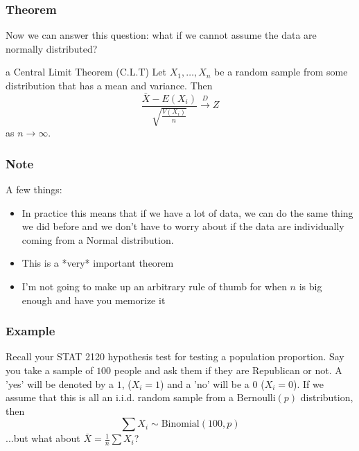 \documentclass{beamer}
\begin{document}
\begin{frame}
\frametitle{Theorem}

Now we can answer this question: what if we cannot assume the data are normally distributed?
\pause

\begin{block}{a Central Limit Theorem (C.L.T)}
Let $X_1, \ldots, X_n$ be a random sample from some distribution that has a mean and variance. Then
\[
\frac{\bar{X} - E(X_i)}{\sqrt{\frac{V(X_i)}{n}}} \overset{D}{\rightarrow} Z
\]
as $n \rightarrow \infty$.
\end{block}


\end{frame}





\begin{frame}
\frametitle{Note}

A few things:
\begin{itemize}
\item In practice this means that if we have a lot of data, we can do the same thing we did before and we don't have to worry about if the data are individually coming from a Normal distribution.
\item This is a *very* important theorem
\item I'm not going to make up an arbitrary rule of thumb for when $n$ is big enough and have you memorize it
\end{itemize}


\end{frame}






\begin{frame}
\frametitle{Example}

Recall your STAT 2120 hypothesis test for testing a population proportion. Say you take a sample of $100$ people and ask them if they are Republican or not. A 'yes' will be denoted by a $1$, ($X_i = 1$) and a 'no' will be a $0$ ($X_i = 0$). If we assume that this is all an i.i.d. random sample from a $\text{Bernoulli}(p)$ distribution, then 
\[
\sum X_i \sim \text{Binomial}(100,p)
\]
...but what about $\bar{X} = \frac{1}{n}\sum X_i$?

\end{frame}
\end{document}
